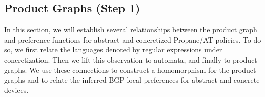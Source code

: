 \documentclass[twocolumn, openany]{sig-alternate-10pt}
\newcommand{\sysname}{{\small \sf Propane/AT}\xspace}
\begin{document}
\subsection{Product Graphs (Step 1)}
In this section, we will establish several relationships between the product graph and preference functions for abstract and concretized \sysname policies. To do so, we first relate the languages denoted by regular expressions under concretization. Then we lift this observation to automata, and finally to product graphs. We use these connections to construct a homomorphism for the product graphs and to relate the inferred BGP local preferences for abstract and concrete devices.


\newcommand{\Lang}{\ensuremath{\mathcal{L}}}

\end{document}
